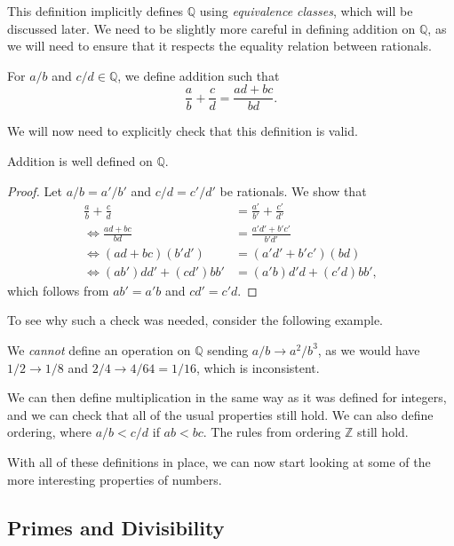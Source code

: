 \documentclass[a4paper]{scrartcl}
\begin{document}
This definition implicitly defines $\mathbb{Q}$ using \emph{equivalence classes}, which will be discussed later. 
We need to be slightly more careful in defining addition on $\mathbb{Q}$, as we will need to ensure that it respects the equality relation between rationals. 

\begin{definition}
	For $a/b$ and $c/d \in \mathbb{Q}$, we define addition such that
	$$
	\frac{a}{b} + \frac{c}{d} = \frac{ad + bc}{bd}.
	$$
\end{definition}

We will now need to explicitly check that this definition is valid.
\begin{proposition}
	Addition is well defined on $\mathbb{Q}$.
\end{proposition}
\begin{proof}
	Let $a/b = a'/b'$ and $c/d = c'/d'$ be rationals. We show that
\begin{align*}
	\frac{a}{b} + \frac{c}{d} &= \frac{a'}{b'} + \frac{c'}{d'} \\
\iff \frac{ad + bc}{bd} &= \frac{a'd' + b'c'}{b'd'} \\
\iff (ad + bc)(b'd') &= (a'd' + b'c')(bd) \\
\iff (ab')dd' + (cd')bb' &= (a'b)d'd + (c'd)bb', 
\end{align*}
which follows from $ab' = a'b$ and $cd' = c'd$.
\end{proof}

To see why such a check was needed, consider the following example.

\begin{example}
	We \emph{cannot} define an operation on $\mathbb{Q}$ sending $a/b \rightarrow a^2 / b^3$, as we would have $1/2 \rightarrow 1/8$ and $2/4 \rightarrow 4/64 = 1/16$, which is inconsistent.
\end{example}

We can then define multiplication in the same way as it was defined for integers, and we can check that all of the usual properties still hold. We can also define ordering, where $a/b < c/d$ if $ab < bc$. The rules from ordering $\mathbb{Z}$ still hold.

With all of these definitions in place, we can now start looking at some of the more interesting properties of numbers.

\subsection{Primes and Divisibility}
\end{document}
